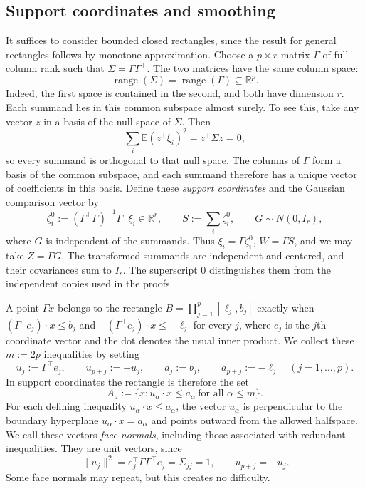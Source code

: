 \documentclass[11pt,letterpaper]{article}
\theoremstyle{remark}
\newcommand{\E}{\mathbb E}
\newcommand{\R}{\mathbb R}
\begin{document}
\subsection{Support coordinates and smoothing}\label{sec:outline-smoothing}
It suffices to consider bounded closed rectangles, since the result for
general rectangles follows by monotone approximation. Choose a \(p\times r\)
matrix \(\Gamma\) of full column rank such that \(\Sigma=\Gamma\Gamma^\top\).
The two matrices have the same column space:
\[
 \operatorname{range}(\Sigma)=\operatorname{range}(\Gamma)\subseteq\R^p.
\]
Indeed, the first space is contained in the second, and both have dimension
\(r\). Each summand lies in this common subspace almost surely. To see this,
take any vector \(z\) in a basis of the null space of \(\Sigma\). Then
\[
 \sum_i\E(z^\top\xi_i)^2=z^\top\Sigma z=0,
\]
so every summand is orthogonal to that null space. The columns of \(\Gamma\)
form a basis of the common subspace, and each summand therefore has a unique
vector of coefficients in this basis. Define these \emph{support coordinates}
and the Gaussian comparison vector by
\[
 \zeta_i^0:=(\Gamma^\top\Gamma)^{-1}\Gamma^\top\xi_i\in\R^r,\qquad
 S:=\sum_i\zeta_i^0,\qquad G\sim N(0,I_r),
\]
where \(G\) is independent of the summands. Thus \(\xi_i=\Gamma\zeta_i^0\),
\(W=\Gamma S\), and we may take \(Z=\Gamma G\).
The transformed summands are independent and centered, and their
covariances sum to \(I_r\). The superscript \(0\) distinguishes them
from the independent copies used in the proofs.

A point \(\Gamma x\) belongs to the rectangle
\(B=\prod_{j=1}^p[\ell_j,b_j]\) exactly when
\((\Gamma^\top e_j)\cdot x\le b_j\) and
\(-(\Gamma^\top e_j)\cdot x\le-\ell_j\) for every \(j\), where \(e_j\)
is the \(j\)th coordinate vector and the dot denotes the usual inner product.
We collect these \(m:=2p\)
inequalities by setting
\[
 u_j:=\Gamma^\top e_j,\qquad u_{p+j}:=-u_j,\qquad
 a_j:=b_j,\qquad a_{p+j}:=-\ell_j\quad (j=1,\ldots,p).
\]
In support coordinates the rectangle is therefore the set
\[
 A_a:=\{x:u_\alpha\cdot x\le a_\alpha\ \text{for all }\alpha\le m\}.
\]
For each defining inequality \(u_\alpha\cdot x\le a_\alpha\), the vector
\(u_\alpha\) is perpendicular to the boundary hyperplane
\(u_\alpha\cdot x=a_\alpha\) and points outward from the allowed halfspace.
We call these vectors \emph{face normals}, including those associated
with redundant inequalities. They are unit vectors, since
\[
 \|u_j\|^2=e_j^\top\Gamma\Gamma^\top e_j=\Sigma_{jj}=1,
 \qquad u_{p+j}=-u_j.
\]
Some face normals may repeat, but this creates no difficulty.
\end{document}

